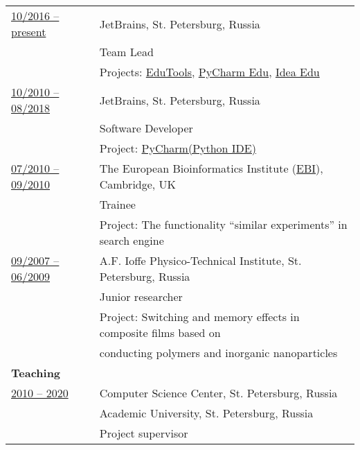 \documentclass[letterpaper,11pt,oneside]{article}
\begin{document}
\noindent \begin{tabular}{@{} l l}
 \underline{10/2016 -- present}   &  JetBrains, St. Petersburg, Russia  \\
                                  &  Team Lead \\
                                  &  Projects: \href{https://plugins.jetbrains.com/plugin/10081-edutools}{EduTools}, 
                                  \href{https://www.jetbrains.com/education/#lang=python&role=learner}{PyCharm Edu}, 
                                  \href{https://www.jetbrains.com/education/#lang=java&lang=kotlin&lang=scala&role=learner}{Idea Edu} \vspace{1em} \\

\underline{10/2010 -- 08/2018}    & JetBrains, St. Petersburg, Russia \\
                          			   & Software Developer  \\
                        	 		     & Project: \href{https://www.jetbrains.com/pycharm/}{PyCharm(Python IDE)} \vspace{1em} \\
                        	 		     
\underline{07/2010 -- 09/2010}    & The European Bioinformatics Institute (\href{https://www.ebi.ac.uk/}{EBI}), Cambridge, UK \\
                          		  	   & Trainee \\
                    		           & Project: The functionality “similar experiments” in search engine \vspace{1em} \\

\underline{09/2007 -- 06/2009}    & A.F. Ioffe Physico-Technical Institute, St. Petersburg, Russia \\
                                  & Junior researcher \\
                          			   & Project: Switching and memory effects in composite films based on \\ 
                          			   & conducting polymers and inorganic nanoparticles \vspace{1em} \\

\noindent \textbf{Teaching} & \vspace{1em} \\

\underline{2010 -- 2020}       & Computer Science Center, St. Petersburg, Russia  \\
                          		  	   & Academic University, St. Petersburg, Russia  \\
                    		           & Project supervisor  \vspace{1em} \\


\end{tabular}
\end{document}
